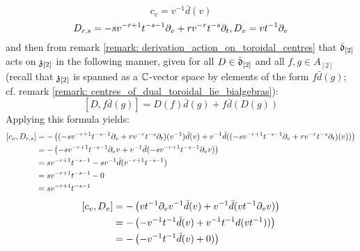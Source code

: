 \begin{remark}
\begin{enumerate}
\begin{enumerate}
\begin{enumerate}
                                $$c_v = v^{-1} \bar{d}(v)$$
                                $$D_{r, s} = -s v^{-r + 1} t^{-s - 1} \del_v + r v^{-r} t^{-s} \del_t, D_v = vt^{-1} \del_v$$
                            and then from remark \ref{remark: derivation_action_on_toroidal_centres} that $\bar{\d}_{[2]}$ acts on $\z_{[2]}$ in the following manner, given for all $D \in \bar{\d}_{[2]}$ and all $f, g \in A_{[2]}$ (recall that $\z_{[2]}$ is spanned as a $\bbC$-vector space by elements of the form $f \bar{d}(g)$; cf. remark \ref{remark: centres_of_dual_toroidal_lie_bialgebras}):
                                $$[D, f \bar{d}(g)] = D(f) \bar{d}(g) + f \bar{d}( D(g) )$$
                            Applying this formula yields:
                                $$
                                    \begin{aligned}
                                        [c_v, D_{r, s}] & = -\left( (-s v^{-r + 1} t^{-s - 1} \del_v + r v^{-r} t^{-s} \del_t)(v^{-1}) \bar{d}(v) + v^{-1} \bar{d}( (-s v^{-r + 1} t^{-s - 1} \del_v + r v^{-r} t^{-s} \del_t)(v) ) \right)
                                        \\
                                        & = -\left( -s v^{-r + 1} t^{-s - 1} \del_v v + v^{-1} \bar{d}( -s v^{-r + 1} t^{-s - 1} \del_v v ) \right)
                                        \\
                                        & = s v^{-r + 1} t^{-s - 1} - s v^{-1} \bar{d}( v^{-r + 1} t^{-s - 1} )
                                        \\
                                        & = s v^{-r + 1} t^{-s - 1} - 0
                                        \\
                                        & = s v^{-r + 1} t^{-s - 1}
                                    \end{aligned}
                                $$
                                $$
                                    \begin{aligned}
                                        [c_v, D_v] & = -\left( v t^{-1} \del_v v^{-1} \bar{d}(v) + v^{-1} \bar{d}(v t^{-1} \del_v v)\right)
                                        \\
                                        & = -\left( - v^{-1} t^{-1} \bar{d}(v) + v^{-1} t^{-1} d(v t^{-1}) ) \right)
                                        \\
                                        & = -\left( - v^{-1} t^{-1} \bar{d}(v) + 0 ) \right)
                                        \\

\end{aligned}$$
\end{enumerate}
\end{enumerate}
\end{enumerate}
\end{remark}

